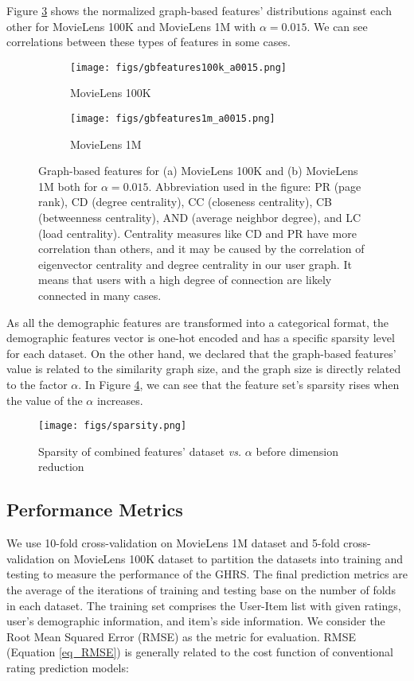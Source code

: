 \documentclass[a4paper,fleqn]{cas-dc}
\begin{document}
Figure \ref{FIG:05} shows the normalized graph-based features' distributions against each other for MovieLens 100K and MovieLens 1M with $\alpha=0.015$. We can see correlations between these types of features in some cases.

\begin{figure}

	\begin{subfigure}{.45\textwidth}
		\centering
		\texttt{[image: figs/gbfeatures100k\_a0015.png]}
		\caption{MovieLens 100K}
		\label{FIG:05:a}
	\end{subfigure}
	\begin{subfigure}{.45\textwidth}
		\centering
		\texttt{[image: figs/gbfeatures1m\_a0015.png]}
		\caption{MovieLens 1M}
		\label{FIG:05:b}
	\end{subfigure}

	\caption{Graph-based features for (a) MovieLens 100K and (b) MovieLens 1M both for $\alpha=0.015$. Abbreviation used in the figure: PR (page rank), CD (degree centrality), CC (closeness centrality), CB (betweenness centrality), AND (average neighbor degree), and LC (load centrality). Centrality measures like CD and PR have more correlation than others, and it may be caused by the correlation of eigenvector centrality and degree centrality in our user graph. It means that users with a high degree of connection are likely connected in many cases.}
	\label{FIG:05}
\end{figure}

As all the demographic features are transformed into a categorical format, the demographic features vector is one-hot encoded and has a specific sparsity level for each dataset. On the other hand, we declared that the graph-based features' value is related to the similarity graph size, and the graph size is directly related to the factor $\alpha$. In Figure \ref{FIG:06}, we can see that the feature set's sparsity rises when the value of the $\alpha$ increases.

\begin{figure}
	\centering
	\texttt{[image: figs/sparsity.png]}
	\caption{Sparsity of combined features' dataset \textit{vs.} $\alpha$ before dimension reduction}
	\label{FIG:06}
\end{figure}


\subsection{Performance Metrics}
\label{metrics}
We use 10-fold cross-validation on MovieLens 1M dataset and 5-fold cross-validation on MovieLens 100K dataset to partition the datasets into training and testing to measure the performance of the GHRS. The final prediction metrics are the average of the iterations of training and testing base on the number of folds in each dataset. The training set comprises the User-Item list with given ratings, user's demographic information, and item's side information. We consider the Root Mean Squared Error (RMSE) as the metric for evaluation. RMSE (Equation \ref{eq_RMSE}) is generally related to the cost function of conventional rating prediction models:
\end{document}
